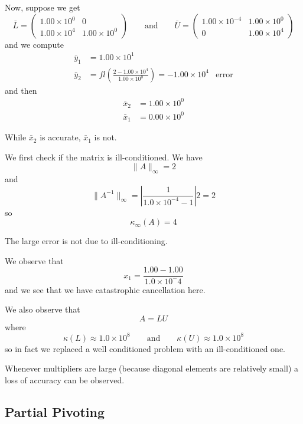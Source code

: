 \begin{example}
    Now, suppose we get \[
        \bar{L} = \begin{pmatrix}
            1.00 \times 10^0 & 0 \\ 1.00 \times 10^4 & 1.00 \times 10^0
        \end{pmatrix}
        \qquad \text{and} \qquad
        \bar{U} = \begin{pmatrix}
            1.00 \times 10^{-4} & 1.00 \times 10^0 \\ 0 & 1.00 \times 10^4
        \end{pmatrix}
    \]
    and we compute
    \begin{align*}
        \bar{y}_1
         & = 1.00 \times 10^1                                               \\
        \bar{y}_2
         & = fl\left( \frac{2 - 1.00 \times 10^4}{1.00 \times 10^0} \right)
        = -1.00 \times 10^4
         & \text{error}
    \end{align*} and then
    \begin{align*}
        \bar{x}_2 & = 1.00 \times 10^0 \\
        \bar{x}_1 & = 0.00 \times 10^0
    \end{align*}

    While \( \bar{x}_2 \) is accurate, \( \bar{x}_1 \) is not.

    We first check if the matrix is ill-conditioned. We have \[
        \| A \|_\infty = 2
    \] and \[
        \| A^{-1} \|_\infty = \left| \frac{1}{1.0 \times10^{-4} - 1} \right| 2 = 2
    \] so \[
        \kappa_\infty(A) = 4
    \]

    The large error is not due to ill-conditioning.

    We observe that \[
        x_1 = \frac{1.00 - 1.00}{1.0 \times 10^-4}
    \] and we see that we have catastrophic cancellation here.

    We also observe that \[
        A = LU
    \] where \[
        \kappa(L) \approx 1.0 \times 10^8
        \qquad{\text{and}}\qquad
        \kappa(U) \approx 1.0 \times 10^8
    \] so in fact we replaced a well conditioned problem with an ill-conditioned one.
\end{example}

\begin{note}[Fact]
    Whenever multipliers are large (because diagonal elements are relatively small) a loss of accuracy can be observed.
\end{note}

\subsection{Partial Pivoting}

